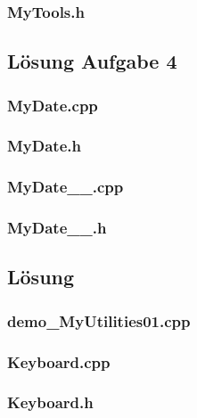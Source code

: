 \subsubsection{MyTools.h}


\subsection{Lösung Aufgabe 4}
\setcounter{subsection}{1}
\subsubsection{MyDate.cpp}

\subsubsection{MyDate.h}

\subsubsection{MyDate\_\_.cpp}

\subsubsection{MyDate\_\_.h}


\setcounter{section}{6}
\setcounter{subsection}{1}

\subsection{Lösung}
\subsubsection{demo\_MyUtilities01.cpp}

\subsubsection{Keyboard.cpp}

\subsubsection{Keyboard.h}

